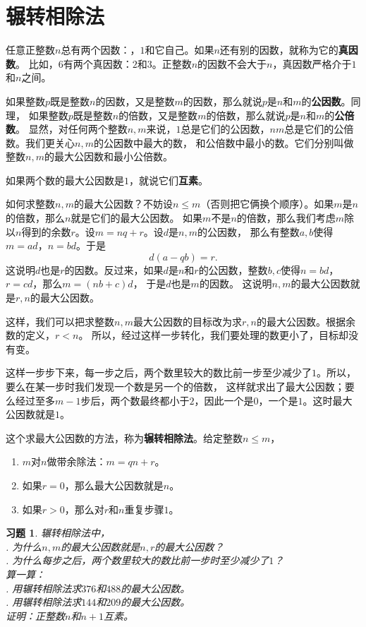\documentclass[12pt,UTF8]{ctexbook}
\newtheorem{xt}{习题}[section]
\begin{document}
\section{辗转相除法}
任意正整数$n$总有两个因数：，$1$和它自己。如果$n$还有别的因数，就称为它的\textbf{真因数}。
比如，$6$有两个真因数：$2$和$3$。正整数$n$的因数不会大于$n$，真因数严格介于$1$和$n$之间。

如果整数$p$既是整数$n$的因数，又是整数$m$的因数，那么就说$p$是$n$和$m$的\textbf{公因数}。同理，
如果整数$p$既是整数$n$的倍数，又是整数$m$的倍数，那么就说$p$是$n$和$m$的\textbf{公倍数}。
显然，对任何两个整数$n,m$来说，$1$总是它们的公因数，$nm$总是它们的公倍数。我们更关心$n,m$的公因数中最大的数，
和公倍数中最小的数。它们分别叫做整数$n,m$的最大公因数和最小公倍数。

如果两个数的最大公因数是$1$，就说它们\textbf{互素}。

如何求整数$n,m$的最大公因数？不妨设$n\leqslant m$（否则把它俩换个顺序）。如果$m$是$n$的倍数，那么$n$就是它们的最大公因数。
如果$m$不是$n$的倍数，那么我们考虑$m$除以$n$得到的余数$r$。设$m = nq + r$。设$d$是$n,m$的公因数，
那么有整数$a,b$使得$m = ad$，$n = bd$。于是
$$ d(a - qb) = r.$$
这说明$d$也是$r$的因数。反过来，如果$d$是$n$和$r$的公因数，整数$b, c$使得$n = bd$，$r = cd$，那么$m = (nb + c)d$，
于是$d$也是$m$的因数。
这说明$n,m$的最大公因数就是$r,n$的最大公因数。

这样，我们可以把求整数$n,m$最大公因数的目标改为求$r,n$的最大公因数。根据余数的定义，$r < n$。
所以，经过这样一步转化，我们要处理的数更小了，目标却没有变。

这样一步步下来，每一步之后，两个数里较大的数比前一步至少减少了$1$。所以，要么在某一步时我们发现一个数是另一个的倍数，
这样就求出了最大公因数；要么经过至多$m-1$步后，两个数最终都小于$2$，因此一个是$0$，一个是$1$。这时最大公因数就是$1$。

这个求最大公因数的方法，称为\textbf{辗转相除法}。给定整数$n\leqslant m$，
\begin{enumerate}
    \item $m$对$n$做带余除法：$m = q n + r$。
    \item 如果$r = 0$，那么最大公因数就是$n$。
    \item 如果$r > 0$，那么对$r$和$n$重复步骤$1$。
\end{enumerate}

\begin{xt}\label{xt:5-1-0}
    辗转相除法中，\\
    . 为什么$n,m$的最大公因数就是$n,r$的最大公因数？\\
    . 为什么每步之后，两个数里较大的数比前一步时至少减少了$1$？\\
    算一算：\\
    . 用辗转相除法求$376$和$488$的最大公因数。\\
    . 用辗转相除法求$144$和$209$的最大公因数。\\
    证明：正整数$n$和$n+1$互素。
\end{xt}
\end{document}
